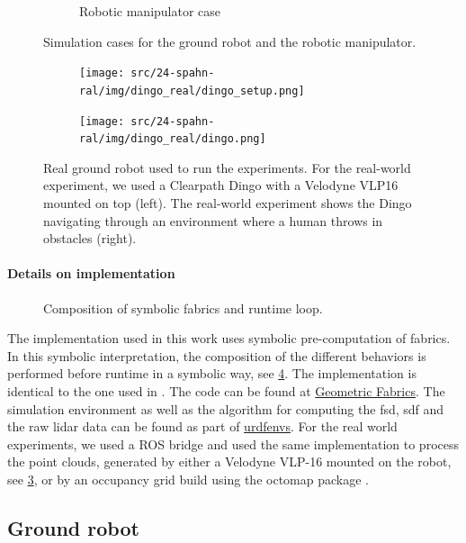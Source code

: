 \begin{figure}[ht]
\begin{subfigure}{0.5\linewidth}
    \caption{Robotic manipulator case}
    \label{fig:panda_case}
  \end{subfigure}%
  \caption{Simulation cases for the ground robot and the robotic manipulator.}
  \label{fig:simulation_cases}
\end{figure}
%
\begin{figure}[ht]
  \begin{subfigure}{0.5\linewidth}
    \texttt{[image: src/24-spahn-ral/img/dingo\_real/dingo\_setup.png]}
  \end{subfigure}%
  \begin{subfigure}{0.5\linewidth}
    \texttt{[image: src/24-spahn-ral/img/dingo\_real/dingo.png]}
  \end{subfigure}%
  \caption{Real ground robot used to run the experiments.
  For the real-world experiment, we used a Clearpath Dingo
  with a Velodyne VLP16 mounted on top (left). The
  real-world experiment shows the Dingo navigating through
  an environment where a human throws in obstacles (right).
  }
  \label{fig:real_dingo}
\end{figure}
%
\paragraph{Details on implementation}
%
\begin{figure}[ht]
  \centering
  
  \caption{Composition of symbolic \ac{fabrics} and runtime loop.}
  \label{fig:composition_symbolic_fabrics}
\end{figure}
%
The implementation used in this work uses symbolic
pre-computation of \ac{fabrics}. In this symbolic
interpretation, the composition of the different behaviors
is performed before runtime in a symbolic way, see
\cref{fig:composition_symbolic_fabrics}. The implementation
is identical to the one used
in \cite{spahn2023autotuning}. The code can be found at
\href{www.github.com/tud-amr/fabrics}{Geometric Fabrics}. The simulation
environment as well as the algorithm for computing the \ac{fsd}, \ac{sdf}
and the raw lidar data can be found as part of
\href{www.github.com/maxspahn/gym_envs_urdf}{urdfenvs}. For the real world
experiments, we used a ROS bridge and used the same
implementation to process the point clouds, generated by
either a Velodyne VLP-16 mounted on the robot, see
\cref{fig:real_dingo}, or by an occupancy grid build using
the octomap package \cite{Hornung2013}.

\subsection{Ground robot}
\label{sub:point_robot}


